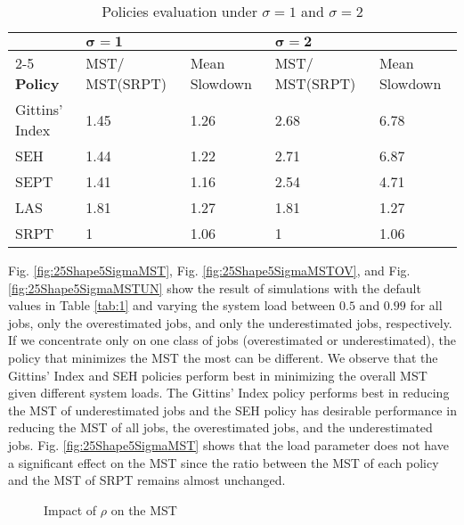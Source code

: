 \begin{table}[t]
\centering
\caption{Policies evaluation under $\sigma=1$ and $\sigma=2$}
\begin{tabular}{|p{2cm}|p{2.30cm}|p{2.30cm}|p{2.30cm}|p{2.30cm}|} 
\hline 
\multirow{2}{*}{} & \multicolumn{2}{|p{1.2cm}|}{$\bm{\sigma=1}$}  & \multicolumn{2}{|p{1.2cm}|}{$\bm{\sigma=2}$}  \\ \cline{2-5} 
\textbf{Policy} & MST/ MST(SRPT) & Mean Slowdown & MST/ MST(SRPT) & Mean Slowdown \\ \hline 
Gittins' Index & 1.45 & 1.26 & 2.68 & 6.78 \\ 
SEH & 1.44 & 1.22 & 2.71 & 6.87 \\ 
SEPT & 1.41 & 1.16 & 2.54 & 4.71 \\  
LAS & 1.81 & 1.27 & 1.81 & 1.27 \\  
SRPT & 1 & 1.06 & 1 & 1.06 \\ 
\hline 
\end{tabular}

\label{tab:2}
\end{table}







Fig. \ref{fig:25Shape5SigmaMST}, Fig. \ref{fig:25Shape5SigmaMSTOV}, and Fig. \ref{fig:25Shape5SigmaMSTUN} show the result of simulations with the default values in Table \ref{tab:1} and varying the system load between $0.5$ and $0.99$ for all jobs, only the overestimated jobs, and only the underestimated jobs, respectively. If we concentrate only on one class of jobs (overestimated or underestimated), the policy that minimizes the MST the most can be different. We observe that the Gittins' Index and SEH policies perform best in minimizing the overall MST given different system loads. The Gittins' Index policy performs best in reducing the MST of underestimated jobs and the SEH policy has desirable performance in reducing the MST of all jobs, the overestimated jobs, and the underestimated jobs. Fig. \ref{fig:25Shape5SigmaMST} shows that the load parameter does not have a significant effect on the MST since the ratio between the MST of each policy and the MST of SRPT remains almost unchanged.





\begin{figure}[t]
\centering
{}
\caption{\label{fig:whole} Impact of $\rho$  on the MST} 
\end{figure}



